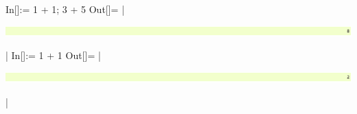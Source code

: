 In[]:= 1 + 1; 3 + 5
Out[]= |
\vspace{-4pt}
\begin{flushleft}
\includegraphics[width=\linewidth]{LstListing/Examples1-2LstListing.pdf}
\end{flushleft}
\vspace{-5pt}
|
In[]:= 1 + 1
Out[]= |
\vspace{-4pt}
\begin{flushleft}
\includegraphics[width=\linewidth]{LstListing/Examples1-3LstListing.pdf}
\end{flushleft}
\vspace{-5pt}
|
